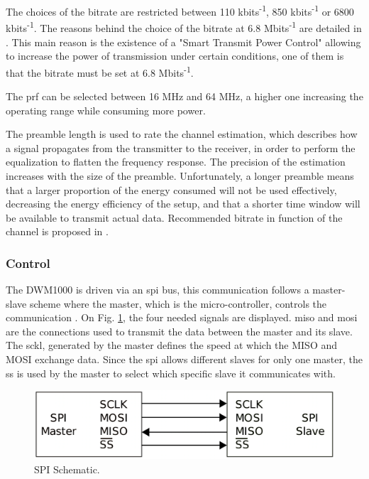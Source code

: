 The choices of the bitrate are restricted between 110 kbits\textsuperscript{-1}, 850 kbits\textsuperscript{-1} or 6800 kbits\textsuperscript{-1}. The reasons behind the choice of the bitrate at 6.8 Mbits\textsuperscript{-1} are detailed in \cite{hannotier2019indoor}. This main reason is the existence of a "Smart Transmit Power Control" allowing to increase the power of transmission under certain conditions, one of them is that the bitrate must be set at 6.8 Mbits\textsuperscript{-1}.
\vspace{2mm}

The \gls{prf} can be selected between 16 MHz and 64 MHz, a higher one increasing the operating range while consuming more power.
\vspace{2mm}

The preamble length is used to rate the channel estimation, which describes how a signal propagates from the transmitter to the receiver, in order to perform the equalization to flatten the frequency response. The precision of the estimation increases with the size of the preamble. Unfortunately, a longer preamble means that a larger proportion of the energy consumed will not be used effectively, decreasing the energy efficiency of the setup, and that a shorter time window will be available to transmit actual data.  Recommended bitrate in function of the channel is proposed in \cite{usermanual}.
\vspace{2mm}

\subsubsection{Control}

The DWM1000 is driven via an \gls{spi} bus, this communication follows a master-slave scheme where the master, which is the micro-controller, controls the communication \cite{busspi}. On Fig. \ref{fig:spi_scheme}, the four needed signals are displayed. \gls{miso} and \gls{mosi} are the connections used to transmit the data between the master and its slave. The \gls{sckl}, generated by the master defines the speed at which the MISO and MOSI exchange data. Since the \gls{spi} allows different slaves for only one master, the \gls{ss} is used by the master to select which specific slave it communicates with. 

\begin{figure}[H]
	\centering
	\includegraphics[width=.6\linewidth]{Images/SPI_scheme.png}
	\caption{SPI Schematic.}
	\label{fig:spi_scheme}
\end{figure}

